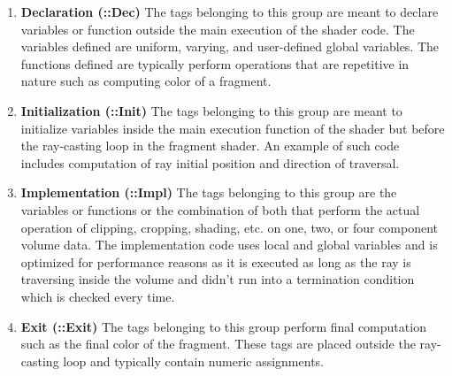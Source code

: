 \begin{enumerate}
\label{enu:shadertags}
  \item \textbf{Declaration (::Dec)} The tags belonging to this group are meant
    to declare variables or function outside the main execution of the shader
    code.  The variables defined are uniform, varying, and user-defined global
    variables.  The functions defined are typically perform operations that are
    repetitive in nature such as computing color of a fragment.

  \item \textbf{Initialization (::Init)} The tags belonging to this group are
    meant to initialize variables inside the main execution function of the
    shader but before the ray-casting loop in the fragment shader. An example of
    such code includes computation of ray initial position and direction
    of traversal.

  \item \textbf{Implementation (::Impl)} The tags belonging to this group are
    the variables or functions or the combination of both that perform the
    actual operation of clipping, cropping, shading, etc. on one, two, or four
    component volume data.  The implementation code uses local and global
    variables and is optimized for performance reasons as it is executed as long
    as the ray is traversing inside the volume and didn't run into a termination
    condition which is checked every time.

  \item \textbf{Exit (::Exit)} The tags belonging to this group perform final
    computation such as the final color of the fragment. These tags are placed
    outside the ray-casting loop and typically contain numeric assignments.
\end{enumerate}

